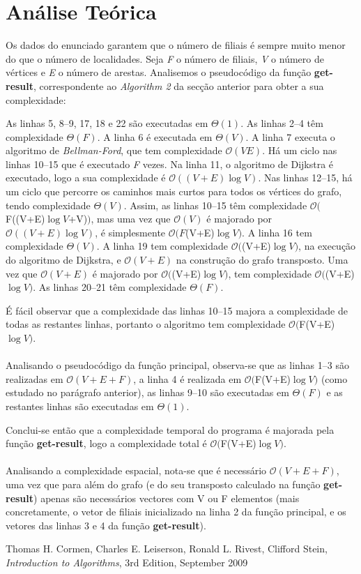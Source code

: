 \documentclass[12pt,a4paper,notitlepage]{article}
\renewcommand{\O}[1]{$\mathcal{O}(#1)$}
\begin{document}
\section{Análise Teórica}
Os dados do enunciado garantem que o número de filiais é sempre muito menor do que o número de localidades.
Seja \emph{F} o número de filiais, \emph{V} o número de vértices e \emph{E} o número de arestas.
Analisemos o pseudocódigo da função \textbf{get-result}, correspondente ao \emph{Algorithm 2} da secção anterior para obter a sua complexidade:

As linhas 5, 8--9, 17, 18 e 22 são executadas em $\Theta(1)$.
As linhas 2--4 têm complexidade $\Theta(F)$.
A linha 6 é executada em $\Theta(V)$.
A linha 7 executa o algoritmo de \emph{Bellman-Ford}, que tem complexidade \O{VE}.
Há um ciclo nas linhas 10--15 que é executado \emph{F} vezes.
Na linha 11, o algoritmo de Dijkstra é executado, logo a sua complexidade é \O{(V+E)\log{V}}.
Nas linhas 12--15, há um ciclo que percorre os caminhos mais curtos para todos os vértices do grafo, tendo complexidade $\Theta(V)$.
Assim, as linhas 10--15 têm complexidade \O{$F((V+E)$\log{V}$+V)$}, mas uma vez que \O{V} é majorado por \O{(V+E)\log{V}}, é simplesmente \O{F$(V+E)$\log{V}}.
A linha 16 tem complexidade $\Theta(V)$.
A linha 19 tem complexidade \O{$(V+E)$\log{V}}, na execução do algoritmo de Dijkstra, e \O{V+E} na construção do grafo transposto. Uma vez que \O{V+E} é majorado por \O{$(V+E)$\log{V}}, tem complexidade \O{$(V+E)$\log{V}}.
As linhas 20--21 têm complexidade $\Theta(F)$.

É fácil observar que a complexidade das linhas 10--15 majora a complexidade de todas as restantes linhas, portanto o algoritmo tem complexidade \O{$F(V+E)$\log{V}}.
\\
\\
Analisando o pseudocódigo da função principal, observa-se que as linhas 1--3 são realizadas em \O{V+E+F}, a linha 4 é realizada em \O{$F(V+E)$\log{V}} (como estudado no parágrafo anterior), as linhas 9--10 são executadas em $\Theta(F)$ e as restantes linhas são executadas em $\Theta(1)$.

Conclui-se então que a complexidade temporal do programa é majorada pela função \textbf{get-result}, logo a complexidade total é \O{$F(V+E)$\log{V}}.
\\
\\
Analisando a complexidade espacial, nota-se que é necessário \O{V+E+F}, uma vez que para além do grafo (e do seu transposto calculado na função \textbf{get-result}) apenas são necessários vectores com V ou F elementos (mais concretamente, o vetor de filiais inicializado na linha 2 da função principal, e os vetores das linhas 3 e 4 da função \textbf{get-result}).

\begin{thebibliography}{9}
				Thomas H. Cormen,
				Charles E. Leiserson,
				Ronald L. Rivest,
				Clifford Stein,
				\emph{Introduction to Algorithms},
				3rd Edition,
				September 2009
\end{thebibliography}
\end{document}
